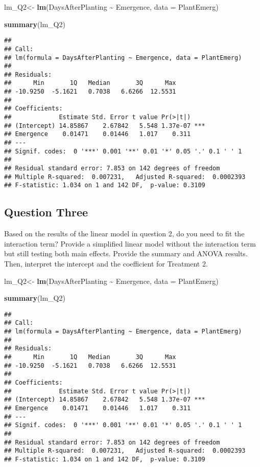 \documentclass[
  12pt,
]{article}
\newenvironment{Shaded}{\begin{snugshade}}{\end{snugshade}}
\newcommand{\AttributeTok}[1]{\textcolor[rgb]{0.13,0.29,0.53}{#1}}
\newcommand{\FunctionTok}[1]{\textcolor[rgb]{0.13,0.29,0.53}{\textbf{#1}}}
\newcommand{\NormalTok}[1]{#1}
\newcommand{\OtherTok}[1]{\textcolor[rgb]{0.56,0.35,0.01}{#1}}
\newcommand{\SpecialCharTok}[1]{\textcolor[rgb]{0.81,0.36,0.00}{\textbf{#1}}}
\begin{document}
\begin{Shaded}
\begin{Highlighting}[]
\NormalTok{lm\_Q2}\OtherTok{\textless{}{-}} \FunctionTok{lm}\NormalTok{(DaysAfterPlanting }\SpecialCharTok{\textasciitilde{}}\NormalTok{ Emergence, }\AttributeTok{data =}\NormalTok{ PlantEmerg)}

\FunctionTok{summary}\NormalTok{(lm\_Q2)}
\end{Highlighting}
\end{Shaded}

\begin{verbatim}
## 
## Call:
## lm(formula = DaysAfterPlanting ~ Emergence, data = PlantEmerg)
## 
## Residuals:
##      Min       1Q   Median       3Q      Max 
## -10.9250  -5.1621   0.7038   6.6266  12.5531 
## 
## Coefficients:
##             Estimate Std. Error t value Pr(>|t|)    
## (Intercept) 14.85867    2.67842   5.548 1.37e-07 ***
## Emergence    0.01471    0.01446   1.017    0.311    
## ---
## Signif. codes:  0 '***' 0.001 '**' 0.01 '*' 0.05 '.' 0.1 ' ' 1
## 
## Residual standard error: 7.853 on 142 degrees of freedom
## Multiple R-squared:  0.007231,   Adjusted R-squared:  0.0002393 
## F-statistic: 1.034 on 1 and 142 DF,  p-value: 0.3109
\end{verbatim}

\subsection{Question Three}\label{question-three}

Based on the results of the linear model in question 2, do you need to
fit the interaction term? Provide a simplified linear model without the
interaction term but still testing both main effects. Provide the
summary and ANOVA results. Then, interpret the intercept and the
coefficient for Treatment 2.

\begin{Shaded}
\begin{Highlighting}[]
\NormalTok{lm\_Q2}\OtherTok{\textless{}{-}} \FunctionTok{lm}\NormalTok{(DaysAfterPlanting }\SpecialCharTok{\textasciitilde{}}\NormalTok{ Emergence, }\AttributeTok{data =}\NormalTok{ PlantEmerg)}

\FunctionTok{summary}\NormalTok{(lm\_Q2)}
\end{Highlighting}
\end{Shaded}

\begin{verbatim}
## 
## Call:
## lm(formula = DaysAfterPlanting ~ Emergence, data = PlantEmerg)
## 
## Residuals:
##      Min       1Q   Median       3Q      Max 
## -10.9250  -5.1621   0.7038   6.6266  12.5531 
## 
## Coefficients:
##             Estimate Std. Error t value Pr(>|t|)    
## (Intercept) 14.85867    2.67842   5.548 1.37e-07 ***
## Emergence    0.01471    0.01446   1.017    0.311    
## ---
## Signif. codes:  0 '***' 0.001 '**' 0.01 '*' 0.05 '.' 0.1 ' ' 1
## 
## Residual standard error: 7.853 on 142 degrees of freedom
## Multiple R-squared:  0.007231,   Adjusted R-squared:  0.0002393 
## F-statistic: 1.034 on 1 and 142 DF,  p-value: 0.3109
\end{verbatim}
\end{document}
